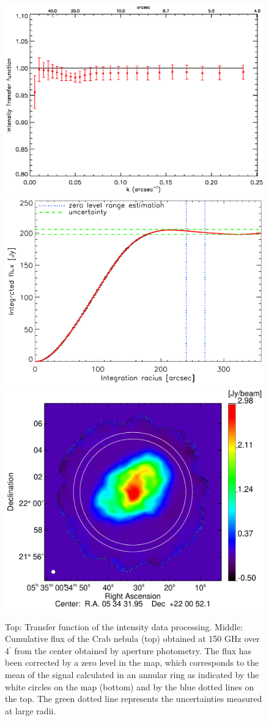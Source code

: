 \documentclass[twocolumn,traditabstract]{aa}
\begin{document}
\begin{figure}[h!]
  \centering
  \includegraphics[width=0.7\linewidth,keepaspectratio]{figures/Crab_transfer_func.eps}
  \includegraphics[width=0.7\linewidth,keepaspectratio]{figures/Crab_integrated_flux_2mm.pdf}
  \includegraphics[width=0.8\linewidth,keepaspectratio]{figures/Crab_I_v3_2mm_ring.pdf}
     \caption{Top: Transfer function of the intensity data processing. Middle:
       Cumulative flux of the Crab nebula (top) obtained at 150 GHz over
       4$^{\prime}$ from the center obtained by aperture photometry. The flux
       has been corrected by a zero level in the map, which corresponds to the
       mean of the signal calculated in an annular ring as indicated by the
       white circles on the map (bottom) and by the blue dotted lines on the
       top. The green dotted line represents the uncertainties measured at large
       radii.}
\label{crab_integrated_flux}
\end{figure}
\end{document}
